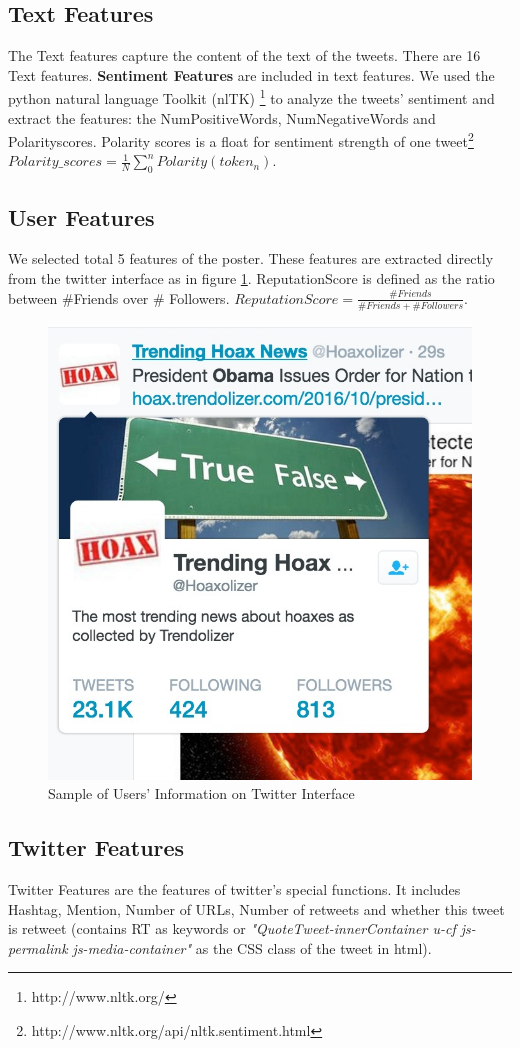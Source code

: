 \subsection{Text Features}
The Text features capture the content of the text of the tweets. There are 16 Text features. 
\textbf{Sentiment Features} are included in text features.
We used the python natural language Toolkit (nlTK) \footnote{http://www.nltk.org/} to analyze the tweets' sentiment and extract the features: the NumPositiveWords, NumNegativeWords and Polarityscores. Polarity scores is a float for sentiment strength of one tweet\footnote{http://www.nltk.org/api/nltk.sentiment.html} $Polarity\_scores = \frac {1}{N}    \sum_{0}^{n} {Polarity(token_n)}$.

\subsection{User Features} We selected total 5 features of the poster. These features are extracted directly from the twitter interface as in figure \ref{fig:UserSample}. ReputationScore is defined as the ratio between \#Friends over \# Followers. $ReputationScore = \frac {\#Friends }{\#Friends +\#Followers}$.
\begin{figure}[!h]
\centering
\includegraphics[width=0.55\columnwidth]{images/UserSample.png}
\caption{Sample of Users' Information on Twitter Interface}
\label{fig:UserSample}
\end{figure}

\subsection{Twitter Features} Twitter Features are the features of twitter's special functions. It includes Hashtag, Mention, Number of URLs, Number of retweets and whether this tweet is retweet (contains RT as keywords or \emph{"QuoteTweet-innerContainer u-cf js-permalink js-media-container"} as the CSS class of the tweet in html).


